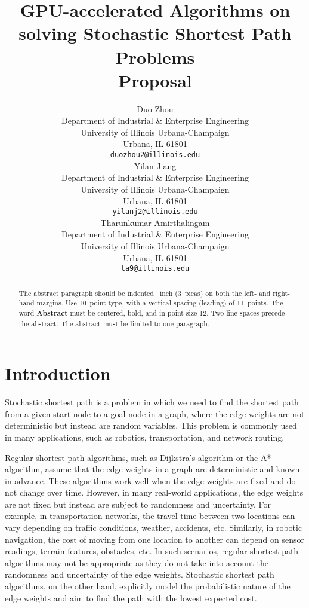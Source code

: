 \documentclass{article}
\title{GPU-accelerated Algorithms on solving Stochastic Shortest Path Problems\\ Proposal}
\author{
  Duo Zhou\\
  Department of Industrial \& Enterprise Engineering\\
  University of Illinois Urbana-Champaign\\
  Urbana, IL 61801 \\
  \texttt{duozhou2@illinois.edu} \\
  \And
  Yilan Jiang \\
  Department of Industrial \& Enterprise Engineering\\
  University of Illinois Urbana-Champaign\\
  Urbana, IL 61801 \\
  \texttt{yilanj2@illinois.edu} \\
  \And
  Tharunkumar Amirthalingam\\
  Department of Industrial \& Enterprise Engineering\\
  University of Illinois Urbana-Champaign\\
  Urbana, IL 61801 \\
  \texttt{ta9@illinois.edu} \\
}
\begin{document}
\maketitle

\begin{abstract}
  The abstract paragraph should be indented ~inch (3~picas) on
  both the left- and right-hand margins. Use 10~point type, with a vertical
  spacing (leading) of 11~points.  The word \textbf{Abstract} must be centered,
  bold, and in point size 12. Two line spaces precede the abstract. The abstract
  must be limited to one paragraph.
\end{abstract}

\section{Introduction}

Stochastic shortest path is a problem in which we need to find the shortest path from a given start node to a goal node in a graph, where the edge weights are not deterministic but instead are random variables. This problem is commonly used in many applications, such as robotics, transportation, and network routing.

Regular shortest path algorithms, such as Dijkstra's algorithm or the A* algorithm, assume that the edge weights in a graph are deterministic and known in advance. These algorithms work well when the edge weights are fixed and do not change over time. However, in many real-world applications, the edge weights are not fixed but instead are subject to randomness and uncertainty. For example, in transportation networks, the travel time between two locations can vary depending on traffic conditions, weather, accidents, etc. Similarly, in robotic navigation, the cost of moving from one location to another can depend on sensor readings, terrain features, obstacles, etc. In such scenarios, regular shortest path algorithms may not be appropriate as they do not take into account the randomness and uncertainty of the edge weights. Stochastic shortest path algorithms, on the other hand, explicitly model the probabilistic nature of the edge weights and aim to find the path with the lowest expected cost.
\end{document}

